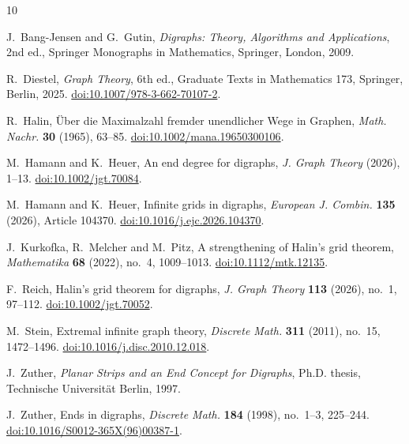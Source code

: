 \documentclass[11pt]{article}
\theoremstyle{remark}
\numberwithin{equation}{section}
\begin{document}
\begin{thebibliography}{10}

J.~Bang-Jensen and G.~Gutin,
\emph{Digraphs: Theory, Algorithms and Applications}, 2nd ed.,
Springer Monographs in Mathematics, Springer, London, 2009.

R.~Diestel,
\emph{Graph Theory}, 6th ed., Graduate Texts in Mathematics 173,
Springer, Berlin, 2025.
\newblock
\href{https://doi.org/10.1007/978-3-662-70107-2}{doi:10.1007/978-3-662-70107-2}.

R.~Halin,
{\"U}ber die Maximalzahl fremder unendlicher Wege in Graphen,
\emph{Math. Nachr.} \textbf{30} (1965), 63--85.
\newblock
\href{https://doi.org/10.1002/mana.19650300106}{doi:10.1002/mana.19650300106}.

M.~Hamann and K.~Heuer,
An end degree for digraphs,
\emph{J. Graph Theory} (2026), 1--13.
\newblock
\href{https://doi.org/10.1002/jgt.70084}{doi:10.1002/jgt.70084}.

M.~Hamann and K.~Heuer,
Infinite grids in digraphs,
\emph{European J. Combin.} \textbf{135} (2026), Article 104370.
\newblock
\href{https://doi.org/10.1016/j.ejc.2026.104370}{doi:10.1016/j.ejc.2026.104370}.

J.~Kurkofka, R.~Melcher and M.~Pitz,
A strengthening of Halin's grid theorem,
\emph{Mathematika} \textbf{68} (2022), no.~4, 1009--1013.
\newblock
\href{https://doi.org/10.1112/mtk.12135}{doi:10.1112/mtk.12135}.

F.~Reich,
Halin's grid theorem for digraphs,
\emph{J. Graph Theory} \textbf{113} (2026), no.~1, 97--112.
\newblock
\href{https://doi.org/10.1002/jgt.70052}{doi:10.1002/jgt.70052}.

M.~Stein,
Extremal infinite graph theory,
\emph{Discrete Math.} \textbf{311} (2011), no.~15, 1472--1496.
\newblock
\href{https://doi.org/10.1016/j.disc.2010.12.018}{doi:10.1016/j.disc.2010.12.018}.

J.~Zuther,
\emph{Planar Strips and an End Concept for Digraphs},
Ph.D. thesis, Technische Universit\"at Berlin, 1997.

J.~Zuther,
Ends in digraphs,
\emph{Discrete Math.} \textbf{184} (1998), no.~1--3, 225--244.
\newblock
\href{https://doi.org/10.1016/S0012-365X(96)00387-1}{doi:10.1016/S0012-365X(96)00387-1}.

\end{thebibliography}
\end{document}
